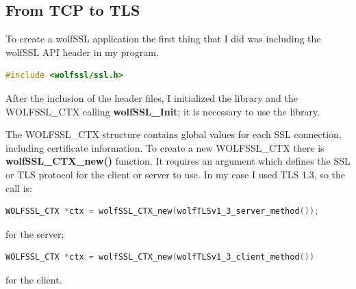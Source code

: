 \documentclass[a4paper,12pt]{article}
\begin{document}

\subsection{From TCP to TLS}
To create a wolfSSL application the first thing that I did was including the wolfSSL API header in my program.
\begin{lstlisting}[language=c]
#include <wolfssl/ssl.h>
\end{lstlisting}
After the inclusion of the header files, I initialized the library and the WOLFSSL\_CTX calling \textbf{wolfSSL\_Init}; it is necessary to use the library.

The WOLFSSL\_CTX structure contains global values for each SSL connection, including certificate information.
To create a new WOLFSSL\_CTX there is \textbf{wolfSSL\_CTX\_new()} function. It requires an argument which defines the SSL or TLS protocol for the client or server to use. In my case I used TLS 1.3, so the call is: 
\begin{lstlisting}[language=c]
WOLFSSL_CTX *ctx = wolfSSL_CTX_new(wolfTLSv1_3_server_method());
\end{lstlisting}
for the server;
\begin{lstlisting}[language=c]
WOLFSSL_CTX *ctx = wolfSSL_CTX_new(wolfTLSv1_3_client_method())
\end{lstlisting}
for the client.
\end{document}
